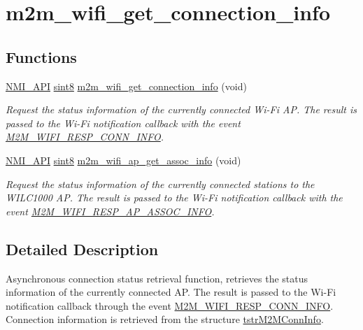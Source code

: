 \hypertarget{group__GetConnectionInfoFn}{}\section{m2m\+\_\+wifi\+\_\+get\+\_\+connection\+\_\+info}
\label{group__GetConnectionInfoFn}
\subsection*{Functions}
\begin{DoxyCompactItemize}
\item 
\hyperlink{group__BSPDefine_gaecc0323d771e41ef81a76b5f12783e22}{N\+M\+I\+\_\+\+A\+PI} \hyperlink{group__DataT_gae35f10ffd0ac8dd2bc3e794da9bdfbc7}{sint8} \hyperlink{group__GetConnectionInfoFn_gaf42861a22b362fd4d74939a009eb6592}{m2m\+\_\+wifi\+\_\+get\+\_\+connection\+\_\+info} (void)
\begin{DoxyCompactList}\small\item\em Request the status information of the currently connected Wi-\/\+Fi AP. The result is passed to the Wi-\/\+Fi notification callback with the event \hyperlink{group__WlanEnums_gga064de09dec1d5e88ed8d075fa40f57dea35767ad0217ab92b149bc77e79610d33}{M2\+M\+\_\+\+W\+I\+F\+I\+\_\+\+R\+E\+S\+P\+\_\+\+C\+O\+N\+N\+\_\+\+I\+N\+FO}. \end{DoxyCompactList}\item 
\hyperlink{group__BSPDefine_gaecc0323d771e41ef81a76b5f12783e22}{N\+M\+I\+\_\+\+A\+PI} \hyperlink{group__DataT_gae35f10ffd0ac8dd2bc3e794da9bdfbc7}{sint8} \hyperlink{group__GetConnectionInfoFn_ga567fc3927ab3a93e232cc3e4c29c673b}{m2m\+\_\+wifi\+\_\+ap\+\_\+get\+\_\+assoc\+\_\+info} (void)
\begin{DoxyCompactList}\small\item\em Request the status information of the currently connected stations to the W\+I\+L\+C1000 AP. The result is passed to the Wi-\/\+Fi notification callback with the event \hyperlink{group__WlanEnums_ggaa62989ea5e2977b374a04db81c89d524ae44909b7e419ce7c69f64ab8399ea67d}{M2\+M\+\_\+\+W\+I\+F\+I\+\_\+\+R\+E\+S\+P\+\_\+\+A\+P\+\_\+\+A\+S\+S\+O\+C\+\_\+\+I\+N\+FO}. \end{DoxyCompactList}\end{DoxyCompactItemize}


\subsection{Detailed Description}
Asynchronous connection status retrieval function, retrieves the status information of the currently connected AP. The result is passed to the Wi-\/\+Fi notification callback through the event \hyperlink{group__WlanEnums_gga064de09dec1d5e88ed8d075fa40f57dea35767ad0217ab92b149bc77e79610d33}{M2\+M\+\_\+\+W\+I\+F\+I\+\_\+\+R\+E\+S\+P\+\_\+\+C\+O\+N\+N\+\_\+\+I\+N\+FO}. Connection information is retrieved from the structure \hyperlink{structtstrM2MConnInfo}{tstr\+M2\+M\+Conn\+Info}.

